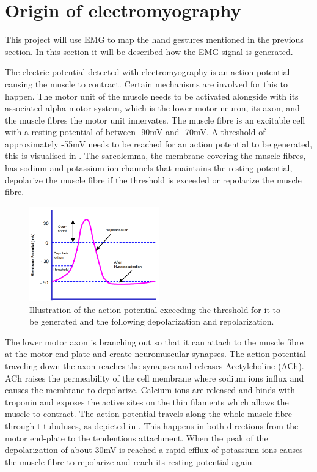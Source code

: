 \section{Origin of electromyography} \label{sec:physiology}
This project will use EMG to map the hand gestures mentioned in the previous section. In this section it will be described how the EMG signal is generated.%

The electric potential detected with electromyography is an action potential causing the muscle to contract. Certain mechanisms are involved for this to happen. The motor unit of the muscle needs to be activated alongside with its associated alpha motor system, which is the lower motor neuron, its axon, and the muscle fibres the motor unit innervates. The muscle fibre is an excitable cell with a resting potential of between -90mV and -70mV. A threshold of approximately -55mV needs to be reached for an action potential to be generated, this is visualised in . The sarcolemma, the membrane covering the muscle fibres, has sodium and potassium ion channels that maintains the resting potential, depolarize the muscle fibre if the threshold is exceeded or repolarize the muscle fibre. \cite{cram2012}


\begin{figure}[H]
	\includegraphics[width=0.5\textwidth]{figures/Anatomy/action_potential}  %
	\caption{Illustration of the action potential exceeding the threshold for it to be generated and the following depolarization and repolarization. \cite{konrad2005}}
	\label{fig:action_potential}  %
\end{figure}

The lower motor axon is branching out so that it can attach to the muscle fibre at the motor end-plate and create neuromuscular synapses. The action potential traveling down the axon reaches the synapses and releases Acetylcholine (ACh). ACh raises the permeability of the cell membrane where sodium ions influx and causes the membrane to depolarize. Calcium ions are released and binds with troponin and exposes the active sites on the thin filaments which allows the muscle to contract. The action potential travels along the whole muscle fibre through t-tubuluses, as depicted in . This happens in both directions from the motor end-plate to the tendentious attachment. When the peak of the depolarization of about 30mV is reached a rapid efflux of potassium ions causes the muscle fibre to repolarize and reach its resting potential again. \cite{cram2012}

